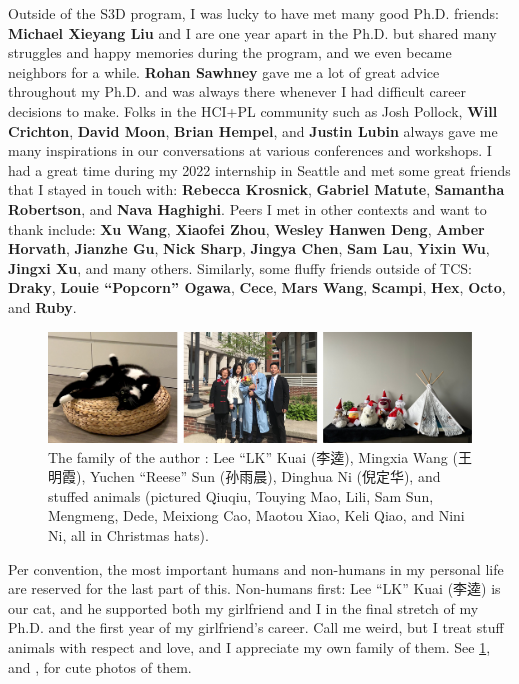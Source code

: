 Outside of the S3D program, I was lucky to have met many good Ph.D. friends: \textbf{Michael Xieyang Liu} and I are one year apart in the Ph.D. but shared many struggles and happy memories during the program, and we even became neighbors for a while. \textbf{Rohan Sawhney} gave me a lot of great advice throughout my Ph.D. and was always there whenever I had difficult career decisions to make. Folks in the HCI+PL community such as Josh Pollock, \textbf{Will Crichton}, \textbf{David Moon}, \textbf{Brian Hempel}, and \textbf{Justin Lubin} always gave me many inspirations in our conversations at various conferences and workshops. I had a great time during my 2022 internship in Seattle and met some great friends that I stayed in touch with: \textbf{Rebecca Krosnick}, \textbf{Gabriel Matute}, \textbf{Samantha Robertson}, and \textbf{Nava Haghighi}. Peers I met in other contexts and want to thank include: \textbf{Xu Wang}, \textbf{Xiaofei Zhou}, \textbf{Wesley Hanwen Deng}, \textbf{Amber Horvath}, \textbf{Jianzhe Gu}, \textbf{Nick Sharp}, \textbf{Jingya Chen}, \textbf{Sam Lau}, \textbf{Yixin Wu}, \textbf{Jingxi Xu}, and many others. Similarly, some fluffy friends outside of TCS: \textbf{Draky}, \textbf{Louie ``Popcorn'' Ogawa}, \textbf{Cece}, \textbf{Mars Wang}, \textbf{Scampi}, \textbf{Hex}, \textbf{Octo}, and \textbf{Ruby}.

\begin{figure}[t]
    \centering
    \includegraphics[width=\linewidth]{assets/fam.pdf}
    \caption{The family of the author : Lee ``LK'' Kuai (李逵), Mingxia Wang (王明霞), Yuchen ``Reese'' Sun (孙雨晨), Dinghua Ni (倪定华), and stuffed animals (pictured Qiuqiu, Touying Mao, Lili, Sam Sun, Mengmeng, Dede, Meixiong Cao, Maotou Xiao, Keli Qiao, and Nini Ni, all in Christmas hats).}
    \label{fig:fam}
\end{figure}

Per convention, the most important humans and non-humans in my personal life are reserved for the last part of this. Non-humans first: Lee ``LK'' Kuai (李逵) is our cat, and he supported both my girlfriend and I in the final stretch of my Ph.D. and the first year of my girlfriend's career. Call me weird, but I treat stuff animals with respect and love, and I appreciate my own family of them. See \cref{fig:fam},  and , for cute photos of them.

